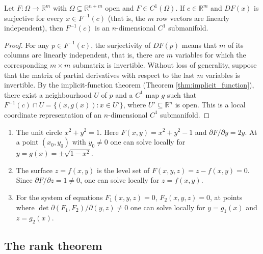 \begin{corollary}\label{cor:regular_level_set_ra}
Let $F: \Omega \to \mathbb{R}^m$ with $\Omega \subseteq \mathbb{R}^{n+m}$ open and $F \in C^1(\Omega)$. If $c \in \mathbb{R}^m$ and $DF(x)$ is surjective for every $x \in F^{-1}(c)$ (that is, the $m$ row vectors are linearly independent), then $F^{-1}(c)$ is an $n$-dimensional $C^1$ submanifold.
\end{corollary}

\begin{proof}
For any $p \in F^{-1}(c)$, the surjectivity of $DF(p)$ means that $m$ of its columns are linearly independent, that is, there are $m$ variables for which the corresponding $m \times m$ submatrix is invertible. Without loss of generality, suppose that the matrix of partial derivatives with respect to the last $m$ variables is invertible. By the implicit-function theorem (Theorem \ref{thm:implicit_function}), there exist a neighbourhood $U$ of $p$ and a $C^1$ map $g$ such that $F^{-1}(c) \cap U = \{(x, g(x)) : x \in U'\}$, where $U' \subseteq \mathbb{R}^n$ is open. This is a local coordinate representation of an $n$-dimensional $C^1$ submanifold.
\end{proof}

\begin{example}\label{ex:implicit_function_application}
\begin{enumerate}[label=(\roman*)]
    \item The unit circle $x^2 + y^2 = 1$. Here $F(x, y) = x^2 + y^2 - 1$ and $\partial F/\partial y = 2y$. At a point $(x_0, y_0)$ with $y_0 \neq 0$ one can solve locally for $y = g(x) = \pm\sqrt{1 - x^2}$.
    \item The surface $z = f(x, y)$ is the level set of $F(x, y, z) = z - f(x, y) = 0$. Since $\partial F/\partial z = 1 \neq 0$, one can solve locally for $z = f(x, y)$.
    \item For the system of equations $F_1(x, y, z) = 0$, $F_2(x, y, z) = 0$, at points where $\det \partial(F_1, F_2)/\partial(y, z) \neq 0$ one can solve locally for $y = g_1(x)$ and $z = g_2(x)$.
\end{enumerate}
\end{example}

\subsection{The rank theorem}

